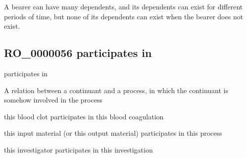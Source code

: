\documentclass[letterpaper,10pt,english]{sphinxmanual}
\begin{document}
\begin{sphinxShadowBox}

\sphinxAtStartPar
A bearer can have many dependents, and its dependents can exist for different periods of time, but none of its dependents can exist when the bearer does not exist.
\end{sphinxShadowBox}

\begin{sphinxShadowBox}

\sphinxAtStartPar
{}
\end{sphinxShadowBox}
\begin{quote}

\ignorespaces \end{quote}


\subsection{RO\_0000056 \sphinxhyphen{} participates in}
\label{\detokenize{doc-RO_0000056:ro-0000056-participates-in}}\label{\detokenize{doc-RO_0000056:index-0}}\label{\detokenize{doc-RO_0000056::doc}}
\begin{sphinxShadowBox}

\sphinxAtStartPar
participates in
\end{sphinxShadowBox}

\begin{sphinxShadowBox}

\sphinxAtStartPar
A relation between a continuant and a process, in which the continuant is somehow involved in the process
\end{sphinxShadowBox}

\begin{sphinxShadowBox}

\sphinxAtStartPar
this blood clot participates in this blood coagulation

\sphinxAtStartPar
this input material (or this output material) participates in this process

\sphinxAtStartPar
this investigator participates in this investigation
\end{sphinxShadowBox}
\end{document}
